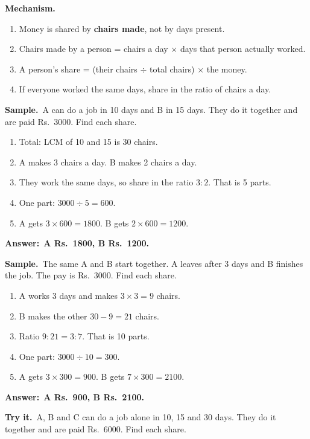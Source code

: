 \documentclass[11pt,a4paper]{article}
\newcommand{\mech}{\textbf{\color{ember}Mechanism.}\ }
\newif\ifkeepsamp
\newcommand{\ans}[1]{\par\nopagebreak\noindent\textbf{\color{ember}Answer:}\ \textbf{#1}\par}
\newcommand{\samp}{\ifkeepsamp\needspace{4\baselineskip}\fi\textbf{\color{ember}Sample.}\ }
\newcommand{\tryit}[1]{\textbf{\color{ember}Try it.}\ #1}
\begin{document}
\mech
\begin{enumerate}
\item Money is shared by \textbf{chairs made}, not by days present.
\item Chairs made by a person = chairs a day $\times$ days that person actually worked.
\item A person's share = (their chairs $\div$ total chairs) $\times$ the money.
\item If everyone worked the same days, share in the ratio of chairs a day.
\end{enumerate}

\samp A can do a job in 10 days and B in 15 days. They do it together and are paid Rs.\ 3000. Find each share.
\begin{enumerate}
\item Total: LCM of 10 and 15 is 30 chairs.
\item A makes 3 chairs a day. B makes 2 chairs a day.
\item They work the same days, so share in the ratio $3 : 2$. That is 5 parts.
\item One part: $3000 \div 5 = 600$.
\item A gets $3 \times 600 = 1800$. B gets $2 \times 600 = 1200$.
\end{enumerate}
\ans{A Rs.\ 1800, B Rs.\ 1200.}

\samp The same A and B start together. A leaves after 3 days and B finishes the job. The pay is Rs.\ 3000. Find each share.
\begin{enumerate}
\item A works 3 days and makes $3 \times 3 = 9$ chairs.
\item B makes the other $30 - 9 = 21$ chairs.
\item Ratio $9 : 21 = 3 : 7$. That is 10 parts.
\item One part: $3000 \div 10 = 300$.
\item A gets $3 \times 300 = 900$. B gets $7 \times 300 = 2100$.
\end{enumerate}
\ans{A Rs.\ 900, B Rs.\ 2100.}

\tryit A, B and C can do a job alone in 10, 15 and 30 days. They do it together and are paid Rs.\ 6000. Find each share.
\end{document}
